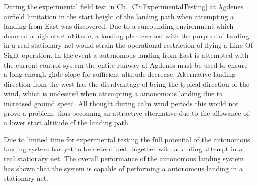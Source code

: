 During the experimental field test in Ch. \ref{Ch:ExperimentalTesting} at Agdenes airfield limitation in the start height of the landing path when attempting a landing from East was discovered. Due to a surrounding environment which demand a high start altitude, a landing plan created with the purpose of landing in a real stationary net would strain the operational restriction of flying a Line Of Sight operation. In the event a autonomous landing from East is attempted with the current control system the entire runway at Agdenes must be used to ensure a long enough glide slope for sufficient altitude decrease. Alternative landing direction from the west has the disadvantage of being the typical direction of the wind, which is undesired when attempting a autonomous landing due to increased ground speed. All thought during calm wind periods this would not prove a problem, thus becoming an attractive alternative due to the allowance of a lower start altitude of the landing path.

Due to limited time for experimental testing the full potential of the autonomous landing system has yet to be determined, together with a landing attempt in a real stationary net. The overall performance of the autonomous landing system has shown that the system is capable of performing a autonomous landing in a stationary net.


